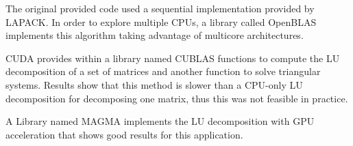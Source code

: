 The original provided code used a sequential implementation provided by LAPACK. In order to explore multiple CPUs,
a library called OpenBLAS implements this algorithm taking advantage of multicore architectures.  

CUDA provides within a library named CUBLAS functions to compute the LU decomposition of a set of matrices and another 
function to solve triangular systems. Results show that this method is slower than a CPU-only LU decomposition for 
decomposing one matrix, thus this was not feasible in practice.

A Library named MAGMA implements the LU decomposition with GPU acceleration that shows good results for this application.

